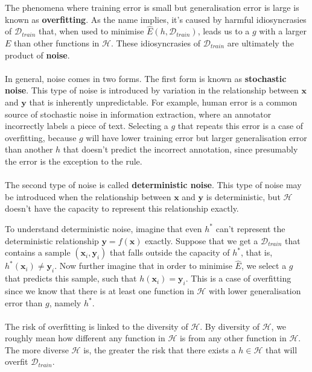 The phenomena where training error is small but generalisation error is large is known as \textbf{overfitting}. As the name implies, it's caused by harmful idiosyncrasies of $\mathcal{D}_{train}$ that, when used to minimise $\hat{E}(h, \mathcal{D}_{train})$, leads us to a $g$ with a larger $E$ than other functions in $\mathcal{H}$. These idiosyncrasies of $\mathcal{D}_{train}$ are ultimately the product of \textbf{noise}.
\\\\
In general, noise comes in two forms. The first form is known as \textbf{stochastic noise}. This type of noise is introduced by variation in the relationship between $\mathbf{x}$ and $\mathbf{y}$ that is inherently unpredictable. For example, human error is a common source of stochastic noise in information extraction, where an annotator incorrectly labels a piece of text. Selecting a $g$ that repeats this error is a case of overfitting, because $g$ will have lower training error but larger generalisation error than another $h$ that doesn't predict the incorrect annotation, since presumably the error is the exception to the rule.
\\\\
The second type of noise is called \textbf{deterministic noise}. This type of noise may be introduced when the relationship between $\mathbf{x}$ and $\mathbf{y}$ is deterministic, but $\mathcal{H}$ doesn't have the capacity to represent this relationship exactly.

To understand deterministic noise, imagine that even $h^*$ can't represent the deterministic relationship $\mathbf{y} = f(\mathbf{x})$ exactly. Suppose that we get a $\mathcal{D}_{train}$ that contains a sample $(\mathbf{x}_i, \mathbf{y}_i)$ that falls outside the capacity of $h^*$, that is, $h^*(\mathbf{x}_i) \neq \mathbf{y}_i$. Now further imagine that in order to minimise $\hat{E}$, we select a $g$ that predicts this sample, such that $h(\mathbf{x}_i) = \mathbf{y}_i$. This is a case of overfitting since we know that there is at least one function in $\mathcal{H}$ with lower generalisation error than $g$, namely $h^*$.
\\\\
The risk of overfitting is linked to the diversity of $\mathcal{H}$. By diversity of $\mathcal{H}$, we roughly mean how different any function in $\mathcal{H}$ is from any other function in $\mathcal{H}$. The more diverse $\mathcal{H}$ is, the greater the risk that there exists a $h \in \mathcal{H}$ that will overfit $\mathcal{D}_{train}$.

